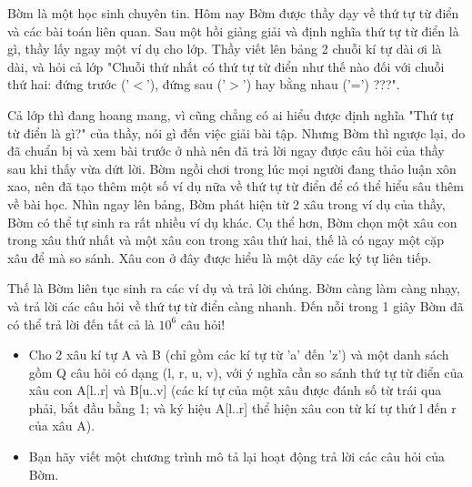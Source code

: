 Bờm là một học sinh chuyên tin. Hôm nay Bờm được thầy dạy về thứ tự từ điển và các bài toán liên quan. Sau một hồi giảng giải và định nghĩa thứ tự từ điển là gì, thầy lấy ngay một ví dụ cho lớp. Thầy viết lên bảng 2 chuỗi kí tự dài ơi là dài, và hỏi cả lớp "Chuỗi thứ nhất có thứ tự từ điển như thế nào đối với chuỗi thứ hai: đứng trước ('$<$'), đứng sau ('$>$') hay bằng nhau ('=') ???".  

   Cả lớp thì đang hoang mang, vì cũng chẳng có ai hiểu được định nghĩa "Thứ tự từ điển là gì?" của thầy, nói gì đến việc giải bài tập. Nhưng Bờm thì ngược lại, do đã chuẩn bị và xem bài trước ở nhà nên đã trả lời ngay được câu hỏi của thầy sau khi thấy vừa dứt lời. Bờm ngồi chơi trong lúc mọi người đang thảo luận xôn xao, nên đã tạo thêm một số ví dụ nữa về thứ tự từ điển để có thể hiểu sâu thêm về bài học. Nhìn ngay lên bảng, Bờm phát hiện từ 2 xâu trong ví dụ của thầy, Bờm có thể tự sinh ra rất nhiều ví dụ khác. Cụ thể hơn, Bờm chọn một xâu con trong xâu thứ nhất và một xâu con trong xâu thứ hai, thế là có ngay một cặp xâu để mà so sánh. Xâu con ở đây được hiểu là một dãy các ký tự liên tiếp.  

   Thế là Bờm liên tục sinh ra các ví dụ và trả lời chúng. Bờm càng làm càng nhạy, và trả lời các câu hỏi về thứ tự từ điển càng nhanh. Đến nỗi trong 1 giây Bờm đã có thể trả lời đến tất cả là $10^{6}$   câu hỏi!
\begin{itemize}
	\item     Cho 2 xâu kí tự A và B (chỉ gồm các kí tự từ 'a' đến 'z') và một danh sách gồm Q câu hỏi có dạng (l, r, u, v), với ý nghĩa cần so sánh thứ tự từ điển của xâu con A[l..r] và B[u..v] (các kí tự của một xâu được đánh số từ trái qua phải, bắt đầu bằng 1; và ký hiệu A[l..r] thể hiện xâu con từ kí tự thứ l đến r của xâu A).   
	\item     Bạn hãy viết một chương trình mô tả lại hoạt động trả lời các câu hỏi của Bờm.   
\end{itemize}
